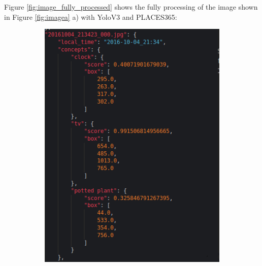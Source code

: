     Figure \ref{fig:image_fully_processed} shows the fully processing of the image shown in Figure \ref{fig:imagea} a) with YoloV3 and PLACES365:
    
    \begin{figure}[H]
      \centering
      \captionsetup{justification=centering}
  
      \begin{subfigure}{0.365\textwidth}
      
      \includegraphics[width=\textwidth]{Sections/4InitialWork/4_images_random/process1.png} 
      \end{subfigure}
      \begin{subfigure}{0.45\textwidth}

\end{subfigure}
\end{figure}
